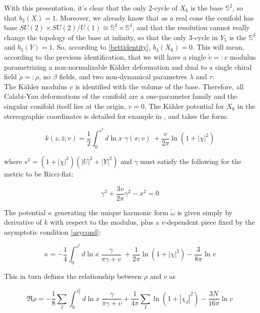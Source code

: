 With this presentation, it's clear that the only 2-cycle of $X_6$ is the base $\mathbb{S}^2$, so that $b_2(X) = 1$. Moreover, we already know that as a real cone the conifold has base $SU(2)\times SU(2) / U(1) \cong \mathbb{S}^2 \times \mathbb{S}^3$, and that the resolution cannot really change the topology of the base at infinity, so that the only 3-cycle in $Y_5$ is the $\mathbb{S}^3$ and $b_3(Y) = 1$. So, according to \ref{bettidentity}, $b_4(X_6) = 0$. This will mean, according to the previous identification, that we will have a single $\tilde v =: v$ modulus parametrizing a non-normalizable K\"ahler deformation and dual to a single chiral field $\tilde\rho =: \rho$, no $\beta$ fields, and two non-dynamical parametres $\lambda$ and $\tau$. \\

The K\"ahler modulus $v$ is identified with the volume of the base. Therefore, all Calabi-Yau deformations of the conifold are a one-parameter family and the singular conifold itself lies at the origin, $v=0$. The K\"ahler potential for $X_6$ in the stereographic coordinates is detailed for example in \cite{PandoZayas}, and takes the form:

\begin{equation}
	k(z,\bar z; v) = \frac{1}{2} \int_0^{s^2} d\ln x \; \gamma(x;v) \; + \frac{v}{2\pi} \ln(1+|\chi|^2)
	\label{}
\end{equation}

where $s^2 = (1+|\chi|^2)(|U|^2 + |Y|^2)$ and $\gamma$ must satisfy the following for the metric to be Ricci-flat:

\begin{equation}
	\gamma^3 + \frac{3v}{2\pi} \gamma^2 - x^2 = 0
	\label{}
\end{equation}

The potential $\kappa$ generating the unique harmonic form $\tilde\omega$ is given simply by derivative of $k$ with respect to the modulus, plus a $v$-dependent piece fixed by the asymptotic condition \ref{asycond}:

\begin{equation}
	\kappa = -\frac{1}{4} \int_0^{s^2} d\ln x \; \frac{\gamma}{\pi\gamma+v} \; + \frac{1}{2\pi} \ln(1+ |\chi|^2) - \frac{3}{8\pi}\ln v
	\label{}
\end{equation}

This in turn defines the relationship between $\rho$ and $v$ as

\begin{equation}
	\Re \rho = - \frac{1}{8} \sum_I \int_0^{s_I^2} d\ln x \; \frac{\gamma}{\pi\gamma + v} + \frac{1}{4\pi}\sum_I \ln(1+|\chi_I|^2) - \frac{3N}{16\pi} \ln v
\end{equation}

